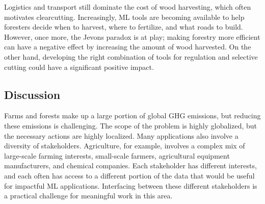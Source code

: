 \documentclass[11pt]{report}
\begin{document}
Logistics and transport still dominate the cost of wood harvesting, which often motivates clearcutting. Increasingly, ML tools \cite{silviaterra} are becoming available to help foresters decide when to harvest, where to fertilize, and what roads to build. However, once more, the Jevons paradox is at play; making forestry more efficient can have a negative effect by increasing the amount of wood harvested. On the other hand, developing the right combination of tools for regulation and selective cutting could have a significant positive impact.

\subsection{Discussion}
Farms and forests make up a large portion of global GHG emissions, but reducing these emissions is challenging. The scope of the problem is highly globalized, but the necessary actions are highly localized. Many applications also involve a diversity of stakeholders. Agriculture, for example, involves a complex mix of large-scale farming interests, small-scale farmers, agricultural equipment manufacturers, and chemical companies. Each stakeholder has different interests, and each often has access to a different portion of the data that would be useful for impactful ML applications. Interfacing between these different stakeholders is a practical challenge for meaningful work in this area.
\end{document}

